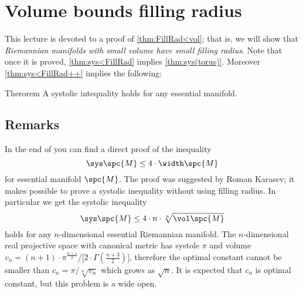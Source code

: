\chapter{Volume bounds filling radius}

This lecture is devoted to a proof of \ref{thm:FillRad<vol};
that is, we will show that {}\emph{Riemannian manifolds with small volume have small filling radius}.
Note that once it is proved, \ref{thm:sys<FillRad} implies \ref{thm:sys(torus)}.
Moreover \ref{thm:sys<FillRad++} implies the following:

\begin{thm}{Therorem}\label{thm:sys(torus)+}
A systolic intequality holds for any essential manifold. 
\end{thm}







\section{Remarks}




In the end of \cite{nabutovsky} you can find a direct proof of the inequality 
\[\sys \spc{M}\le 4\cdot \width\spc{M}\]
for essential manifold $\spc{M}$.
The proof was suggested by Roman Karasev;
it makes possible to prove a systolic inequality without using filling radius.
In particular we get the systolic inequality 
\[\sys \spc{M}\le 4\cdot n\cdot\sqrt[n]{\vol\spc{M}}\]
holds for any $n$-dimensional essential Riemannian manifold.
The $n$-dimensional real projective space with canonical metric has systole $\pi$ and volume $v_n={(n+1)\cdot\pi^\frac{n+1}{2}}/[{2\cdot \Gamma(\tfrac{n+3}{2})]}$, therefore the optimal constant 
cannot be smaller than $c_n=\pi/\sqrt[n]{v_n}$ which grows as $\sqrt n$.
It is expected that $c_n$ is optimal constant, but this problem is a wide open.
